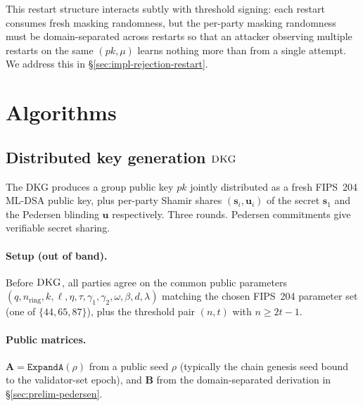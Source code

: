 \documentclass[11pt,a4paper]{article}
\theoremstyle{definition}
\theoremstyle{remark}
\newcommand{\DKG}{\textsc{DKG}}
\begin{document}
This restart structure interacts subtly with threshold signing: each
restart consumes fresh masking randomness, but the per-party masking
randomness must be domain-separated across restarts so that an
attacker observing multiple restarts on the same $(\mathit{pk}, \mu)$
learns nothing more than from a single attempt. We address this in
\S\ref{sec:impl-rejection-restart}.

\section{Algorithms}
\label{sec:algorithms}

\subsection{Distributed key generation \texorpdfstring{$\DKG$}{DKG}}
\label{sec:dkg}

The DKG produces a group public key $\mathit{pk}$ jointly distributed
as a fresh FIPS~204 ML-DSA public key, plus per-party Shamir shares
$(\mathbf{s}_i, \mathbf{u}_i)$ of the secret $\mathbf{s}_1$ and the
Pedersen blinding $\mathbf{u}$ respectively. Three rounds. Pedersen
commitments give verifiable secret sharing.

\paragraph{Setup (out of band).}
Before $\DKG$, all parties agree on the common public parameters
$(q, n_{\mathrm{ring}}, k, \ell, \eta, \tau, \gamma_1, \gamma_2, \omega, \beta, d, \lambda)$
matching the chosen FIPS~204 parameter set (one of $\{44, 65, 87\}$),
plus the threshold pair $(n, t)$ with $n \ge 2t-1$.

\paragraph{Public matrices.}
$\mathbf{A} = \texttt{ExpandA}(\rho)$ from a public seed $\rho$
(typically the chain genesis seed bound to the validator-set epoch),
and $\mathbf{B}$ from the domain-separated derivation in
\S\ref{sec:prelim-pedersen}.
\end{document}
